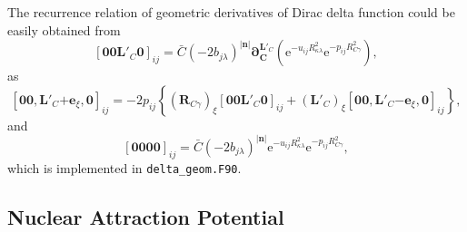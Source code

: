 \documentclass[a4paper,11pt,twoside,openright]{book}
\begin{document}
The recurrence relation of geometric derivatives of Dirac delta function could be easily obtained from
\begin{equation}
  \left[\boldsymbol{00}\boldsymbol{L}'_{C}\boldsymbol{0}\right]_{ij}
  =\bar{C}(-2b_{j\lambda})^{|\boldsymbol{n}|}%
    \boldsymbol{\partial}_{\boldsymbol{C}}^{\boldsymbol{L}'_{C}}%
    \left(\mathrm{e}^{-u_{ij}R_{\kappa\lambda}^2}\mathrm{e}^{-p_{ij}R_{C\gamma}^2}\right),
\end{equation}
as
\begin{equation}
  \label{eq:delta-geo-c}
  \left[\boldsymbol{00},\boldsymbol{L}'_{C}\mathrm{+}\boldsymbol{e}_{\xi},\boldsymbol{0}\right]_{ij}
  =-2p_{ij}\left\{(\boldsymbol{R}_{C\gamma})_{\xi}%
    \left[\boldsymbol{00}\boldsymbol{L}'_{C}\boldsymbol{0}\right]_{ij}%
  +(\boldsymbol{L}'_{C})_{\xi}%
    \left[\boldsymbol{00},\boldsymbol{L}'_{C}\mathrm{-}\boldsymbol{e}_{\xi},\boldsymbol{0}\right]_{ij}\right\},
\end{equation}
and
\begin{equation}
  \left[\boldsymbol{0000}\right]_{ij}
  =\bar{C}(-2b_{j\lambda})^{|\boldsymbol{n}|}%
    \mathrm{e}^{-u_{ij}R_{\kappa\lambda}^2}\mathrm{e}^{-p_{ij}R_{C\gamma}^2},
\end{equation}
which is implemented in \verb|delta_geom.F90|.

\subsection{Nuclear Attraction Potential}
\label{subsec:nucpot}
\end{document}
